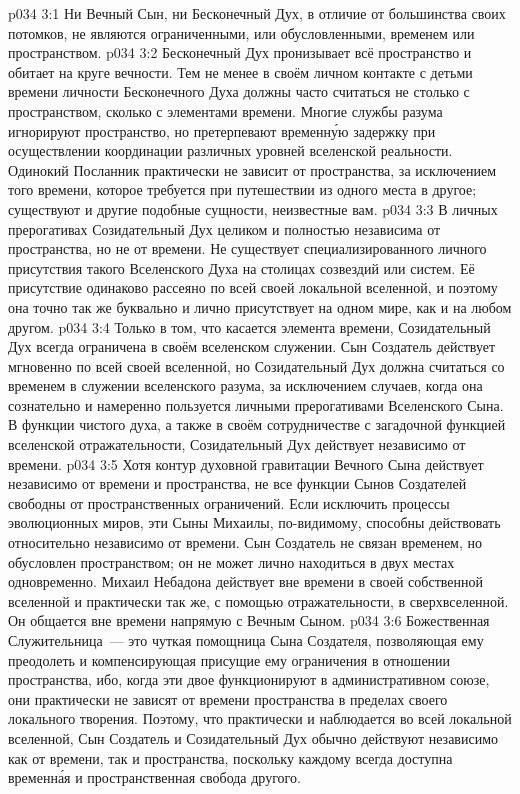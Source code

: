 \vs p034 3:1 Ни Вечный Сын, ни Бесконечный Дух, в отличие от большинства своих потомков, не являются ограниченными, или обусловленными, временем или пространством.
\vs p034 3:2 Бесконечный Дух пронизывает всё пространство и обитает на круге вечности. Тем не менее в своём личном контакте с детьми времени личности Бесконечного Духа должны часто считаться не столько с пространством, сколько с элементами времени. Многие службы разума игнорируют пространство, но претерпевают временн\'ую задержку при осуществлении координации различных уровней вселенской реальности. Одинокий Посланник практически не зависит от пространства, за исключением того времени, которое требуется при путешествии из одного места в другое; существуют и другие подобные сущности, неизвестные вам.
\vs p034 3:3 \pc В личных прерогативах Созидательный Дух целиком и полностью независима от пространства, но не от времени. Не существует специализированного личного присутствия такого Вселенского Духа на столицах созвездий или систем. Её присутствие одинаково рассеяно по всей своей локальной вселенной, и поэтому она точно так же буквально и лично присутствует на одном мире, как и на любом другом.
\vs p034 3:4 Только в том, что касается элемента времени, Созидательный Дух всегда ограничена в своём вселенском служении. Сын Создатель действует мгновенно по всей своей вселенной, но Созидательный Дух должна считаться со временем в служении вселенского разума, за исключением случаев, когда она сознательно и намеренно пользуется личными прерогативами Вселенского Сына. В функции чистого духа, а также в своём сотрудничестве с загадочной функцией вселенской отражательности, Созидательный Дух действует независимо от времени.
\vs p034 3:5 \pc Хотя контур духовной гравитации Вечного Сына действует независимо от времени и пространства, не все функции Сынов Создателей свободны от пространственных ограничений. Если исключить процессы эволюционных миров, эти Сыны Михаилы, по\hyp{}видимому, способны действовать относительно независимо от времени. Сын Создатель не связан временем, но обусловлен пространством; он не может лично находиться в двух местах одновременно. Михаил Небадона действует вне времени в своей собственной вселенной и практически так же, с помощью отражательности, в сверхвселенной. Он общается вне времени напрямую с Вечным Сыном.
\vs p034 3:6 Божественная Служительница~--- это чуткая помощница Сына Создателя, позволяющая ему преодолеть и компенсирующая присущие ему ограничения в отношении пространства, ибо, когда эти двое функционируют в административном союзе, они практически не зависят от времени  пространства в пределах своего локального творения. Поэтому, что практически и наблюдается во всей локальной вселенной, Сын Создатель и Созидательный Дух обычно действуют независимо как от времени, так и пространства, поскольку каждому всегда доступна временн\'ая и пространственная свобода другого.
